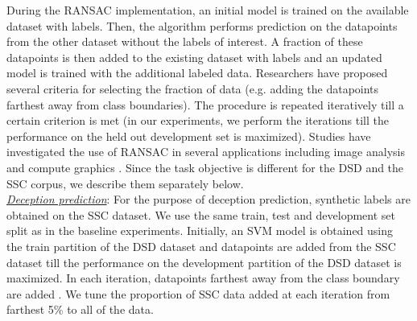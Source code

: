 \documentclass{article}
\begin{document}
During the RANSAC \cite{fischler1981random} implementation, an initial model is trained on the available dataset with labels.
Then, the algorithm performs prediction on the datapoints from the other dataset without the labels of interest.
A fraction of these datapoints is then added to the existing dataset with labels and an updated model is trained with the additional labeled data.
Researchers have proposed several criteria for selecting the fraction of data (e.g. adding the datapoints farthest away from class boundaries).
The procedure is repeated iteratively till a certain criterion is met (in our experiments, we perform the iterations till the performance on the held out development set is maximized).
Studies have investigated the use of RANSAC in several applications including image analysis \cite{fischler1981random} and compute graphics \cite{caraiman2009new}. 
Since the task objective is different for the DSD and the SSC corpus, we describe them separately below. 
\\

\noindent\underline{\it Deception prediction}:  
For the purpose of deception prediction, synthetic labels are obtained on the SSC dataset.
We use the same train, test and development set split as in the baseline experiments.
Initially, an SVM model is obtained using the train partition of the DSD dataset and datapoints are added from the SSC dataset till the performance on the development partition of the DSD dataset is maximized.
In each iteration, datapoints farthest away from the class boundary are added \cite{raguram2008comparative}.
We tune the proportion of SSC data added at each iteration from farthest 5\% to all of the data.
\\
\end{document}
